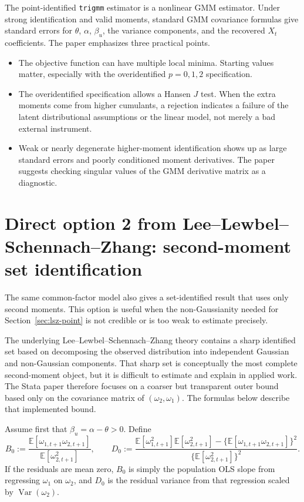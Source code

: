\documentclass[11pt]{article}
\newcommand{\E}{\mathbb{E}}
\newcommand{\Var}{\operatorname{Var}}
\theoremstyle{plain}
\theoremstyle{definition}
\theoremstyle{remark}
\begin{document}
The point-identified \texttt{trigmm} estimator is a nonlinear GMM estimator. Under
strong identification and valid moments, standard GMM covariance formulas give
standard errors for $\theta$, $\alpha$, $\beta_u$, the variance components, and the
recovered $X_t$ coefficients. The paper emphasizes three practical points.
\begin{itemize}
\item The objective function can have multiple local minima. Starting values
matter, especially with the overidentified $p=0,1,2$ specification.
\item The overidentified specification allows a Hansen $J$ test. When the extra
moments come from higher cumulants, a rejection indicates a failure of the
latent distributional assumptions or the linear model, not merely a bad external
instrument.
\item Weak or nearly degenerate higher-moment identification shows up as large
standard errors and poorly conditioned moment derivatives. The paper suggests
checking singular values of the GMM derivative matrix as a diagnostic.
\end{itemize}

\section{Direct option 2 from Lee--Lewbel--Schennach--Zhang: second-moment set identification}
\label{sec:lsz-set}

The same common-factor model also gives a set-identified result that uses only
second moments. This option is useful when the non-Gaussianity needed for
Section~\ref{sec:lsz-point} is not credible or is too weak to estimate precisely.

The underlying Lee--Lewbel--Schennach--Zhang theory contains a sharp identified
set based on decomposing the observed distribution into independent Gaussian and
non-Gaussian components. That sharp set is conceptually the most complete
second-moment object, but it is difficult to estimate and explain in applied
work. The Stata paper therefore focuses on a coarser but transparent outer bound
based only on the covariance matrix of $(\omega_2,\omega_1)$. The formulas below describe
that implemented bound.

Assume first that $\beta_u=\alpha-\theta>0$. Define
\begin{equation}
B_0:=\frac{\E[\omega_{1,t+1}\omega_{2,t+1}]}{\E[\omega_{2,t+1}^2]},
\qquad
D_0:=
\frac{\E[\omega_{1,t+1}^2]\E[\omega_{2,t+1}^2]-\{\E[\omega_{1,t+1}\omega_{2,t+1}]\}^2}
     {\{\E[\omega_{2,t+1}^2]\}^2}.
\label{eq:B0D0}
\end{equation}
If the residuals are mean zero, $B_0$ is simply the population OLS slope from
regressing $\omega_1$ on $\omega_2$, and $D_0$ is the residual variance from that regression
scaled by $\Var(\omega_2)$.
\end{document}
